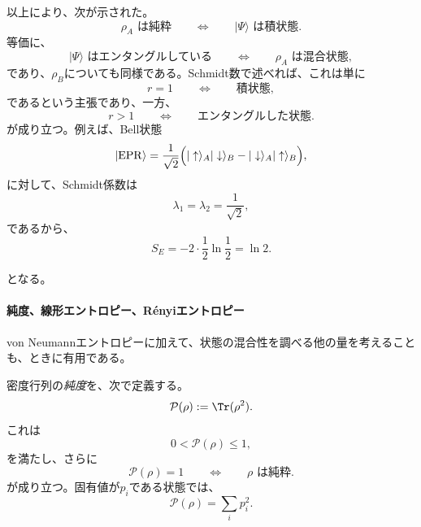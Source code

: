 \documentclass[a4paper,11pt,oneside]{article}
\theoremstyle{definition}
\numberwithin{equation}{section}
\begin{document}
以上により、次が示された。
\begin{equation}
\rho_A \text{ は純粋}
\qquad \Longleftrightarrow \qquad
|\Psi\rangle \text{ は積状態}.
\end{equation}
等価に、
\begin{equation}
|\Psi\rangle \text{ はエンタングルしている}
\qquad \Longleftrightarrow \qquad
\rho_A \text{ は混合状態},
\end{equation}
であり、$\rho_B$についても同様である。Schmidt数で述べれば、これは単に
\begin{equation}
r=1
\qquad \Longleftrightarrow \qquad
\text{積状態},
\end{equation}
であるという主張であり、一方、
\begin{equation}
r>1
\qquad \Longleftrightarrow \qquad
\text{エンタングルした状態}.
\end{equation}
が成り立つ。例えば、Bell状態
\begin{equation}
|\mathrm{EPR}\rangle
=
\frac{1}{\sqrt{2}}
\Bigl(
|\uparrow\rangle_A |\downarrow\rangle_B
-
|\downarrow\rangle_A |\uparrow\rangle_B
\Bigr) ,
\end{equation}
に対して、Schmidt係数は
\begin{equation}
\lambda_1=\lambda_2=\frac{1}{\sqrt{2}} ,
\end{equation}
であるから、
\begin{equation}
S_E = -2 \cdot \frac12 \ln \frac12 = \ln 2 .
\end{equation}




となる。\paragraph{純度、線形エントロピー、R\'enyiエントロピー}



von Neumannエントロピーに加えて、状態の混合性を調べる他の量を考えることも、ときに有用である。



密度行列の\textit{純度}を、次で定義する。
\begin{equation}
\mathcal P(\rho) := \Tr(\rho^2) .
\end{equation}
これは
\begin{equation}
0<\mathcal P(\rho)\le 1 ,
\end{equation}
を満たし、さらに
\begin{equation}
\mathcal P(\rho)=1
\qquad \Longleftrightarrow \qquad
\rho \text{ は純粋}.
\end{equation}
が成り立つ。固有値が$p_i$である状態では、
\begin{equation}
\mathcal P(\rho)=\sum_i p_i^2 .
\end{equation}
\end{document}
